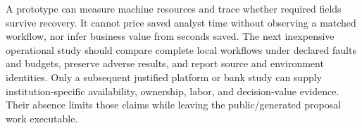 A prototype can measure machine resources and trace whether required fields
survive recovery. It cannot price saved analyst time without observing a
matched workflow, nor infer business value from seconds saved. The next
inexpensive operational study should compare complete local workflows under
declared faults and budgets, preserve adverse results, and report source and
environment identities. Only a subsequent justified platform or bank study
can supply institution-specific availability, ownership, labor, and
decision-value evidence. Their absence limits those claims while leaving
the public/generated proposal work executable.
